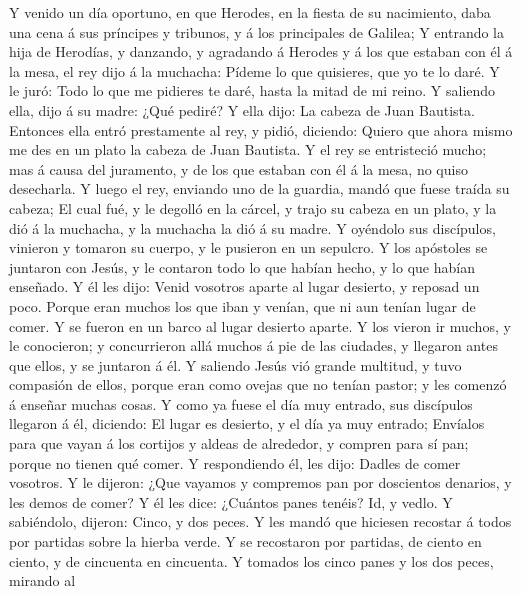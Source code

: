  Y venido un día oportuno, en que Herodes, en la fiesta
de su nacimiento, daba una cena á sus príncipes y tribunos, y á los
principales de Galilea;  Y entrando la hija de Herodías,
y danzando, y agradando á Herodes y á los que estaban con él á la mesa,
el rey dijo á la muchacha: Pídeme lo que quisieres, que yo te lo daré.
 Y le juró: Todo lo que me pidieres te daré, hasta la
mitad de mi reino.  Y saliendo ella, dijo á su madre:
¿Qué pediré? Y ella dijo: La cabeza de Juan Bautista. 
Entonces ella entró prestamente al rey, y pidió, diciendo: Quiero que
ahora mismo me des en un plato la cabeza de Juan Bautista.
 Y el rey se entristeció mucho; mas á causa del
juramento, y de los que estaban con él á la mesa, no quiso desecharla.
 Y luego el rey, enviando uno de la guardia, mandó que
fuese traída su cabeza;  El cual fué, y le degolló en la
cárcel, y trajo su cabeza en un plato, y la dió á la muchacha, y la
muchacha la dió á su madre.  Y oyéndolo sus discípulos,
vinieron y tomaron su cuerpo, y le pusieron en un sepulcro.
 Y los apóstoles se juntaron con Jesús, y le contaron
todo lo que habían hecho, y lo que habían enseñado.  Y él
les dijo: Venid vosotros aparte al lugar desierto, y reposad un poco.
Porque eran muchos los que iban y venían, que ni aun tenían lugar de
comer.  Y se fueron en un barco al lugar desierto aparte.
 Y los vieron ir muchos, y le conocieron; y concurrieron
allá muchos á pie de las ciudades, y llegaron antes que ellos, y se
juntaron á él.  Y saliendo Jesús vió grande multitud, y
tuvo compasión de ellos, porque eran como ovejas que no tenían pastor; y
les comenzó á enseñar muchas cosas.  Y como ya fuese el
día muy entrado, sus discípulos llegaron á él, diciendo: El lugar es
desierto, y el día ya muy entrado;  Envíalos para que
vayan á los cortijos y aldeas de alrededor, y compren para sí pan;
porque no tienen qué comer.  Y respondiendo él, les dijo:
Dadles de comer vosotros. Y le dijeron: ¿Que vayamos y compremos pan por
doscientos denarios, y les demos de comer?  Y él les
dice: ¿Cuántos panes tenéis? Id, y vedlo. Y sabiéndolo, dijeron: Cinco,
y dos peces.  Y les mandó que hiciesen recostar á todos
por partidas sobre la hierba verde.  Y se recostaron por
partidas, de ciento en ciento, y de cincuenta en cincuenta.
 Y tomados los cinco panes y los dos peces, mirando al
